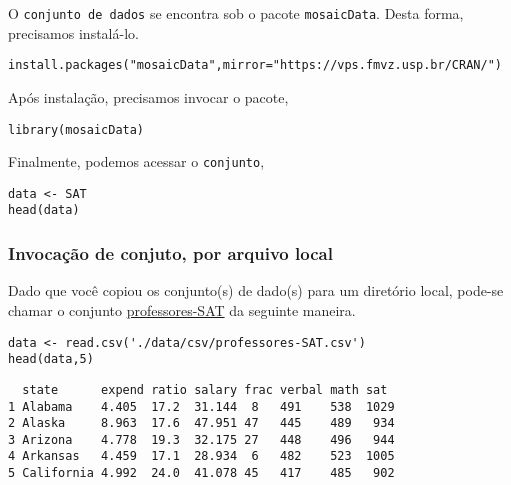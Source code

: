 \documentclass[11pt]{article}
\begin{document}
O \texttt{conjunto de dados} se encontra sob o pacote \texttt{mosaicData}. Desta forma, precisamos
instalá-lo.

\begin{verbatim}
install.packages("mosaicData",mirror="https://vps.fmvz.usp.br/CRAN/")
\end{verbatim}

Após instalação, precisamos invocar o pacote,
\begin{verbatim}
library(mosaicData)
\end{verbatim}

Finalmente, podemos acessar o \texttt{conjunto},
\begin{verbatim}
data <- SAT
head(data)
\end{verbatim}

\subsubsection{Invocação de conjuto, por arquivo local}
\label{sec:orgb4bbb70}

Dado que você copiou os conjunto(s) de dado(s) para um diretório
local, pode-se chamar o conjunto \href{https://drive.google.com/file/d/1E6aOdH1nf0qF4Lky131iX1LNBjaIYAev/view?usp=sharing}{professores-SAT} da seguinte maneira.

\begin{verbatim}
data <- read.csv('./data/csv/professores-SAT.csv')
head(data,5)
\end{verbatim}

\begin{verbatim}
  state      expend ratio salary frac verbal math sat 
1 Alabama    4.405  17.2  31.144  8   491    538  1029
2 Alaska     8.963  17.6  47.951 47   445    489   934
3 Arizona    4.778  19.3  32.175 27   448    496   944
4 Arkansas   4.459  17.1  28.934  6   482    523  1005
5 California 4.992  24.0  41.078 45   417    485   902
\end{verbatim}
\end{document}
